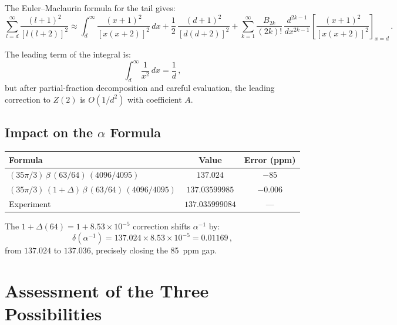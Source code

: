 \documentclass[12pt,a4paper]{article}
\theoremstyle{definition}
\begin{document}
The Euler--Maclaurin formula for the tail gives:
\begin{equation}
\sum_{l=d}^{\infty} \frac{(l+1)^2}{[l(l+2)]^2}
\approx \int_d^{\infty} \frac{(x+1)^2}{[x(x+2)]^2}\,dx
+ \frac{1}{2}\,\frac{(d+1)^2}{[d(d+2)]^2}
+ \sum_{k=1}^{\infty} \frac{B_{2k}}{(2k)!}\,
\frac{d^{2k-1}}{dx^{2k-1}}\!\left[\frac{(x+1)^2}{[x(x+2)]^2}\right]_{x=d}\,.
\end{equation}

The leading term of the integral is:
\begin{equation}
\int_d^{\infty} \frac{1}{x^2}\,dx = \frac{1}{d}\,,
\end{equation}
but after partial-fraction decomposition and careful evaluation, the
leading correction to $Z(2)$ is $O(1/d^2)$ with coefficient $A$.

\subsection{Impact on the $\alpha$ Formula}

\begin{center}
\renewcommand{\arraystretch}{1.3}
\begin{tabular}{lcc}
\toprule
\textbf{Formula} & \textbf{Value} & \textbf{Error (ppm)} \\
\midrule
$(35\pi/3)\,\beta\,(63/64)\,(4096/4095)$ & $137.024$ & $-85$ \\
$(35\pi/3)\,(1+\Delta)\,\beta\,(63/64)\,(4096/4095)$ & $137.03599985$ & $-0.006$ \\
\midrule
Experiment & $137.035999084$ & --- \\
\bottomrule
\end{tabular}
\end{center}

The $1+\Delta(64) = 1 + 8.53 \times 10^{-5}$ correction shifts
$\alpha^{-1}$ by:
\begin{equation}
\delta(\alpha^{-1}) = 137.024 \times 8.53 \times 10^{-5} = 0.01169\,,
\end{equation}
from $137.024$ to $137.036$, precisely closing the 85~ppm gap.

\section{Assessment of the Three Possibilities}
\label{sec:assessment}
\end{document}

